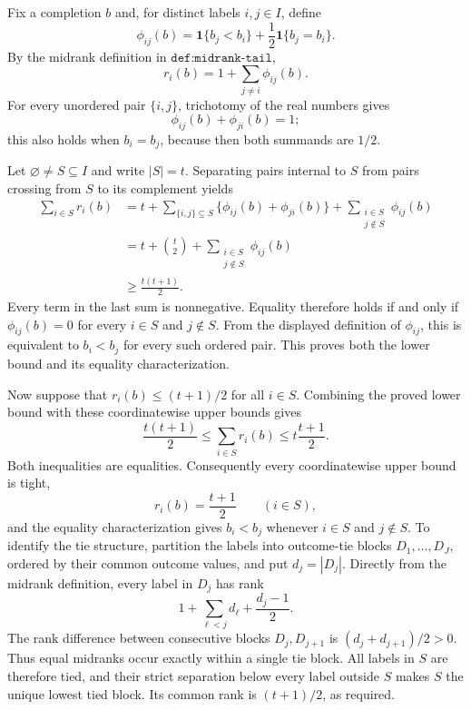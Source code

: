 Fix a completion \(b\) and, for distinct labels \(i,j\in I\), define
\[
 \phi_{ij}(b)
 =\mathbf 1\{b_j<b_i\}+\frac12\mathbf 1\{b_j=b_i\}.
\]
By the midrank definition in \(\texttt{def:midrank-tail}\),
\[
 r_i(b)=1+\sum_{j\ne i}\phi_{ij}(b).
\]
For every unordered pair \(\{i,j\}\), trichotomy of the real numbers gives
\[
 \phi_{ij}(b)+\phi_{ji}(b)=1;
\]
this also holds when \(b_i=b_j\), because then both summands are \(1/2\).

Let \(\varnothing\ne S\subseteq I\) and write \(|S|=t\).  Separating pairs internal to \(S\) from pairs crossing from \(S\) to its complement yields
\[
\begin{aligned}
 \sum_{i\in S}r_i(b)
 &=t+
   \sum_{\{i,j\}\subseteq S}\bigl\{\phi_{ij}(b)+\phi_{ji}(b)\bigr\}
   +\sum_{\substack{i\in S\\j\notin S}}\phi_{ij}(b)\\
 &=t+\binom{t}{2}
   +\sum_{\substack{i\in S\\j\notin S}}\phi_{ij}(b)\\
 &\ge \frac{t(t+1)}2.
\end{aligned}
\]
Every term in the last sum is nonnegative.  Equality therefore holds if and only if
\(\phi_{ij}(b)=0\) for every \(i\in S\) and \(j\notin S\).  From the displayed definition of \(\phi_{ij}\), this is equivalent to \(b_i<b_j\) for every such ordered pair.  This proves both the lower bound and its equality characterization.

Now suppose that \(r_i(b)\le (t+1)/2\) for all \(i\in S\).  Combining the proved lower bound with these coordinatewise upper bounds gives
\[
 \frac{t(t+1)}2
 \le \sum_{i\in S}r_i(b)
 \le t\frac{t+1}{2}.
\]
Both inequalities are equalities.  Consequently every coordinatewise upper bound is tight,
\[
 r_i(b)=\frac{t+1}{2}\qquad(i\in S),
\]
and the equality characterization gives \(b_i<b_j\) whenever \(i\in S\) and \(j\notin S\).
To identify the tie structure, partition the labels into outcome-tie blocks \(D_1,\ldots,D_J\), ordered by their common outcome values, and put \(d_j=|D_j|\).  Directly from the midrank definition, every label in \(D_j\) has rank
\[
 1+\sum_{\ell<j}d_\ell+\frac{d_j-1}{2}.
\]
The rank difference between consecutive blocks \(D_j,D_{j+1}\) is \((d_j+d_{j+1})/2>0\).  Thus equal midranks occur exactly within a single tie block.  All labels in \(S\) are therefore tied, and their strict separation below every label outside \(S\) makes \(S\) the unique lowest tied block.  Its common rank is \((t+1)/2\), as required.

